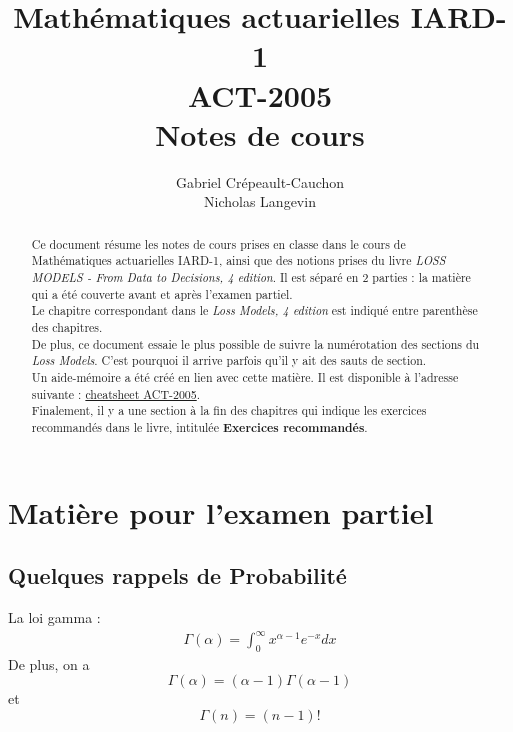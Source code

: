 \documentclass[12pt, french]{report}
\title{Mathématiques actuarielles IARD-1 \\
ACT-2005 \\
Notes de cours}
\author{Gabriel Crépeault-Cauchon \\
Nicholas Langevin}
\begin{document}
\maketitle

\tableofcontents


\begin{abstract}
Ce document résume les notes de cours prises en classe dans le cours de Mathématiques actuarielles IARD-1, ainsi que des notions prises du livre \textit{LOSS MODELS - From Data to Decisions, 4 edition}. Il est séparé en 2 parties : la matière qui a été couverte avant et après l'examen partiel. \\

Le chapitre correspondant dans le \emph{Loss Models, 4 edition} est indiqué entre parenthèse des chapitres. \\

De plus, ce document essaie le plus possible de suivre la numérotation des sections du \emph{Loss Models}. C'est pourquoi il arrive parfois qu'il y ait des sauts de section. \\

Un aide-mémoire a été créé en lien avec cette matière. Il est disponible à l'adresse suivante : \href{https://github.com/gabrielcrepeault/latex-template/tree/master/act-cheatsheet/ACT2005}{cheatsheet ACT-2005}. \\

Finalement, il y a une section à la fin des chapitres qui indique les exercices recommandés dans le livre, intitulée \textbf{Exercices recommandés}.
\end{abstract}


\part{Matière pour l'examen partiel}

\chapter{Quelques rappels de Probabilité}
La loi gamma : 
\begin{align*}
\Gamma(\alpha) = \int_{0}^{\infty} x^{\alpha-1} e^{-x} dx
\end{align*}
De plus, on a
\[\Gamma(\alpha) = (\alpha-1) \Gamma(\alpha-1)\]
et
\[\Gamma(n) = (n-1)!\]
\end{document}
